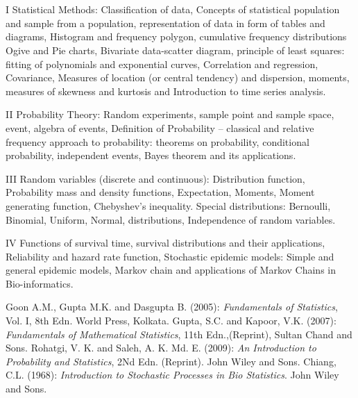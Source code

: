 \section{\courseinfo}
\unit{I}
Statistical Methods: Classification of data, Concepts of statistical population and sample from a population, representation of data in form of tables and diagrams, Histogram and frequency polygon, cumulative frequency distributions Ogive and Pie charts, Bivariate data-scatter diagram, principle of least squares: fitting of polynomials and exponential curves, Correlation and regression, Covariance, Measures of location (or central tendency) and dispersion, moments, measures of skewness and kurtosis and Introduction to time series analysis.

\unit{II}
Probability Theory: Random experiments, sample point and sample space, event, algebra of events, Definition of Probability – classical and relative frequency approach to probability: theorems on probability, conditional probability, independent events, Bayes theorem and its applications. 

\unit{III}
Random variables (discrete and continuous): Distribution function, Probability mass and density functions, Expectation, Moments, Moment generating function, Chebyshev’s inequality. Special distributions: Bernoulli, Binomial, Uniform, Normal, distributions, Independence of random variables.

\unit{IV}
Functions of survival time, survival distributions and their applications, Reliability and hazard rate function, Stochastic epidemic models: Simple and general epidemic models, Markov chain and applications of Markov Chains in Bio-informatics.


\begin{thebibliography}{99}
         Goon A.M., Gupta M.K. and Dasgupta B. (2005): \emph{Fundamentals of Statistics}, Vol. I, 8th  Edn. World Press, Kolkata. 
         Gupta, S.C. and Kapoor, V.K. (2007): \emph{Fundamentals of Mathematical Statistics}, 11th  Edn.,(Reprint), Sultan Chand and Sons. 
       Rohatgi, V. K. and Saleh, A. K. Md. E. (2009): \emph{An Introduction to Probability and Statistics}, 2Nd Edn. (Reprint). John Wiley and Sons.
         Chiang, C.L. (1968): \emph{Introduction to Stochastic Processes in Bio Statistics}. John Wiley and Sons.

\end{thebibliography}



